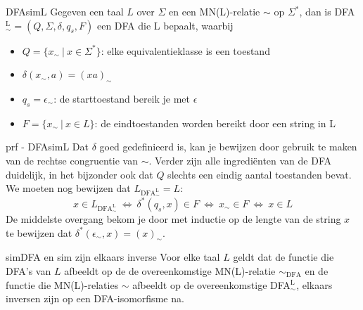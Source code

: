 \begin{lem}{DFAsimL}
    \vspace{-0.1cm}
    Gegeven een taal $L$ over $\Sigma$ en een MN(L)-relatie $\sim$ op $\Sigma^*$, dan is DFA$_{\sim}^{\text{L}} = (Q, \Sigma, \delta, q_s, F)$ een DFA die L bepaalt, waarbij
    \begin{itemize}
        \item $Q = \{x_{\sim} \ | \ x \in \Sigma^* \}$: elke equivalentieklasse is een toestand
        \item $\delta(x_{\sim},a) = (xa)_{\sim}$
        \item $q_s = \epsilon_{\sim}$: de starttoestand bereik je met $\epsilon$
        \item $F = \{x_{\sim} \ | \ x \in L \}$: de eindtoestanden worden bereikt door een string in L
    \end{itemize}  
    \vspace{-0.2cm}
\end{lem}

\begin{prf}{prf - DFAsimL}
    \vspace{-0.1cm}
    Dat $\delta$ goed gedefinieerd is, kan je bewijzen door gebruik te maken van de rechtse congruentie van $\sim$.
    Verder zijn alle ingrediënten van de DFA duidelijk, in het bijzonder ook dat $Q$ slechts een eindig aantal toestanden bevat.
    We moeten nog bewijzen dat $L_{\text{DFA}_{\sim}^{\text{L}}} = L$:
    \begin{equation*}
        x \in L_{\text{DFA}_{\sim}^{\text{L}}} \ \Leftrightarrow \ \delta^*(q_s,x) \in F \ \Leftrightarrow \ x_{\sim} \in F \ \Leftrightarrow \ x \in L
    \end{equation*}
    De middelste overgang bekom je door met inductie op de lengte van de string $x$ te bewijzen dat $\delta^*(\epsilon_{\sim},x) = (x)_{\sim}$.
\end{prf}

\begin{lem}{simDFA en sim zijn elkaars inverse}
    Voor elke taal $L$ geldt dat de functie die DFA's van $L$ afbeeldt op de de overeenkomstige MN(L)-relatie $\sim_{\text{DFA}}$ en de functie 
    die MN(L)-relaties $\sim$ afbeeldt op de overeenkomstige DFA$_{\sim}^{\text{L}}$, elkaars inversen zijn op een DFA-isomorfisme na.
\end{lem}


